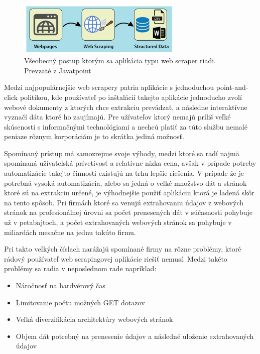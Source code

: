 \begin{figure}[hbt]
	\centering
	\includegraphics[width=0.7\textwidth]{obrazky-figures/web-scraping-using-python.png}
	\caption{Všeobecný postup ktorým sa aplikácia typu web scraper riadi. Prevzaté z Javatpoint \cite{WebScrap}}
	\label{WebScrap_img}
\end{figure}

\bigskip

Medzi najpopulárnejšie web scrapery patria aplikácie s jednoduchou point-and-click politikou, kde používateľ po inštalácií takejto aplikácie jednoducho zvolí webové dokumenty z ktorých chce extrakciu prevádzať, a následne interaktívne vyznačí dáta ktoré ho zaujímajú. Pre užívateľov ktorý nemajú príliš veľké skúsenosti s informačnými technológiami a nechcú platiť za túto službu nemalé peniaze rôznym korporáciám je to skrátka jediná možnosť.

\bigskip

Spomínaný prístup má samozrejme svoje výhody, medzi ktoré sa radí najmä spomínaná užívateľská prívetivosť a relatívne nízka cena, avšak v prípade potreby automatizácie takejto činnosti existujú na trhu lepšie riešenia. V prípade že je potrebná vysoká automatizácia, alebo sa jedná o veľké množstvo dát a stránok ktoré sú na extrakciu určené, je výhodnejšie použiť aplikáciu ktorá je ladená skôr na tento spôsob. Pri firmách ktoré sa venujú extrahovaniu údajov z webových stránok na profesionálnej úrovni sa počet prenesených dát v súčasnosti pohybuje už v petabajtoch, a počet extrahovaných webových stránok sa pohybuje v miliardách mesačne na jednu takúto firmu. 

Pri takto veľkých číslach narážajú spomínané firmy na rôzne problémy, ktoré rádový používateľ web scrapingovej aplikácie riešiť nemusí. Medzi takéto problémy sa radia v neposlednom rade napríklad:
\begin{itemize}
    \item {Náročnosť na hardvérový čas}
    \item {Limitovanie počtu možných GET dotazov}
    \item {Veľká diverzifikácia architektúry webových stránok}
    \item {Objem dát potrebný na prenesenie údajov a následné uloženie extrahovaných údajov}
\end{itemize}

